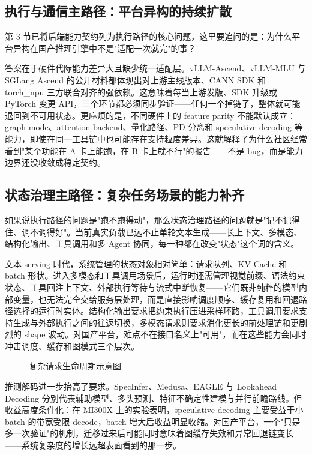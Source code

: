 \subsection{执行与通信主路径：平台异构的持续扩散}

第 3 节已将后端能力契约列为执行路径的核心问题，这里要追问的是：为什么平台异构在国产推理引擎中不是"适配一次就完"的事？

答案在于硬件代际能力差异大且缺少统一适配层。vLLM-Ascend、vLLM-MLU 与 SGLang Ascend 的公开材料都体现出对上游主线版本、CANN SDK 和 torch\_npu 三方联合对齐的强依赖\citep{vllmascend,vllmmlu,sglang_ascend_npu}。这意味着每当上游发版、SDK 升级或 PyTorch 变更 API，三个环节都必须同步验证——任何一个掉链子，整体就可能退回到不可用状态。更麻烦的是，不同硬件上的 feature parity 不能默认成立：graph mode、attention backend、量化路径、PD 分离和 speculative decoding 等能力，即使在同一工具链中也可能存在支持粒度差异\citep{fastdeploy_docs,lmdeploy_supported_models}。这就解释了为什么社区经常看到"某个功能在 A 卡上能跑，在 B 卡上就不行"的报告——不是 bug，而是能力边界还没收敛成稳定契约。

\subsection{状态治理主路径：复杂任务场景的能力补齐}

如果说执行路径的问题是"跑不跑得动"，那么状态治理路径的问题就是"记不记得住、调不调得好"。当前真实负载已远不止单轮文本生成——长上下文、多模态、结构化输出、工具调用和多 Agent 协同\citep{dong2024xgrammar,liu2025elasticmm,xie2025aimetropolis}，每一种都在改变"状态"这个词的含义。

文本 serving 时代，系统管理的状态对象相对简单：请求队列、KV Cache 和 batch 形状。进入多模态和工具调用场景后，运行时还需管理视觉前缀、语法约束状态、工具回注上下文、外部执行等待与流式中断恢复——它们既非纯粹的模型内部变量，也无法完全交给服务层处理，而是直接影响调度顺序、缓存复用和回退路径选择的运行时实体。结构化输出要求把约束执行压进采样环路，工具调用要求支持生成与外部执行之间的往返切换，多模态请求则要求消化更长的前处理链和更剧烈的 shape 波动。对国产平台，难点不在接口名义上"可用"，而在这些能力会同时冲击调度、缓存和图模式三个层次。

\begin{figure}[!htb]
\centering
\resizebox{0.85\linewidth}{!}{}
\caption{复杂请求生命周期示意图}
\label{fig:complex-request-lifecycle}
\end{figure}

推测解码进一步抬高了要求。SpecInfer、Medusa、EAGLE 与 Lookahead Decoding 分别代表辅助模型、多头预测、特征不确定性建模与并行前瞻路线\citep{specinfer2023,leviathan2023fast,cai2024medusa,li2024eagle,fu2024lookahead}。但收益高度条件化：在 MI300X 上的实验表明，speculative decoding 主要受益于小 batch 的带宽受限 decode，batch 增大后收益明显收缩\citep{singh2025specdecmi300x}。对国产平台，一个"只是多一次验证"的机制，迁移过来后可能同时意味着图缓存失效和异常回退链变长——系统复杂度的增长远超表面看到的那一步。

